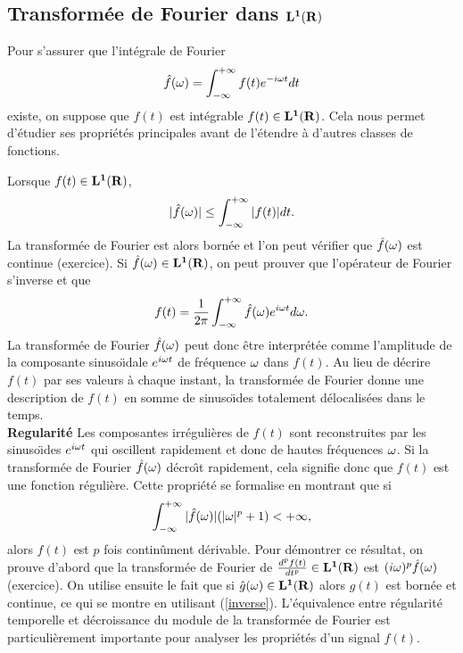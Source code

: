 \subsection{Transform\'ee de Fourier dans ${\bf L ^ 1 ({\bf{R}})}$}

Pour s'assurer que l'int\'egrale de Fourier
\begin{equation}
\label{fourier}
\hat f ( {\omega} ) = \int_{- \infty}^{+ \infty} 
f(t ) e^{-i {\omega} t} dt
\end{equation}
existe, on suppose que $f(t)$ est int\'egrable
$f(t) \in {\bf L ^ 1 ({\bf{R}})}$. Cela nous permet d'\'etudier ses propri\'et\'es
principales avant de l'\'etendre \`a d'autres classes de fonctions.

Lorsque $f(t) \in {\bf L ^ 1 ({\bf{R}})}$, 
\begin{equation}
|\hat f({\omega})| \leq \int_{- \infty}^{+ \infty} |f(t )| dt .
\end{equation}
La transform\'ee de Fourier est alors born\'ee et l'on peut
v\'erifier que $\hat f ({\omega})$ est continue (exercice).
Si $\hat f ({\omega}) \in {\bf L ^ 1 ({\bf{R}})}$, on peut
prouver \cite{bony} que l'op\'erateur de Fourier s'inverse et que
\begin{equation}
\label{inverse}
f ( t ) = \frac 1 {2 \pi} \int_{- \infty}^{+ \infty} 
\hat f({\omega} ) e^{i {\omega} t} d {\omega} .
\end{equation}
La transform\'ee de Fourier $\hat f({\omega})$ peut donc \^etre 
interpr\'et\'ee
comme l'amplitude de la composante sinuso\"{\i}dale $e^{i {\omega} t}$
de fr\'equence ${\omega}$ dans $f(t)$.
Au lieu de d\'ecrire $f(t)$ par ses valeurs \`a chaque instant,
la transform\'ee de Fourier donne une description de $f(t)$
en somme de sinuso\"{\i}des
totalement d\'elocalis\'ees dans le temps.\\

{\bf Regularit\'e}
Les composantes irr\'eguli\`eres de $f(t)$ sont reconstruites
par les sinuso\"{\i}des $e^{i {\omega} t}$ qui oscillent rapidement 
et donc de hautes fr\'equences
${\omega}$. Si la transform\'ee de Fourier $\hat f({\omega})$ d\'ecro\^{\i}t
rapidement, cela signifie donc que $f(t)$ est une fonction
r\'eguli\`ere. Cette propri\'et\'e se formalise en montrant 
que si
\[
\int_{-\infty}^{+\infty}|\hat f({\omega})| (|{\omega}|^p + 1 ) < +\infty ,
\]
alors $f(t)$ est $p$ fois contin\^ument d\'erivable. Pour d\'emontrer
ce r\'esultat, on prouve d'abord que la transform\'ee de Fourier
de $\frac {d^p f(t)} {dt^p}\in {\bf L ^ 1 ({\bf{R}})}$ est 
$(i {\omega})^p \hat f({\omega})$ (exercice). On utilise ensuite le fait
que si $\hat g ({\omega}) \in {\bf L ^ 1 ({\bf{R}})}$ alors $g(t)$ est born\'ee et
continue, ce qui se montre en utilisant (\ref{inverse}).
L'\'equivalence entre r\'egularit\'e temporelle et d\'ecroissance 
du module de la transform\'ee de Fourier est particuli\`erement
importante pour analyser les propri\'et\'es d'un signal $f(t)$.


